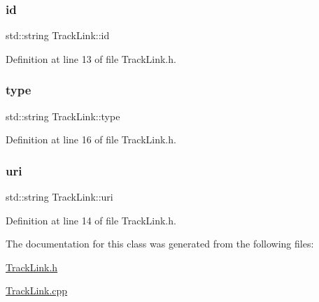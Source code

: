 \subsubsection{\texorpdfstring{id}{id}}
{\footnotesize\ttfamily std\+::string Track\+Link\+::id\hspace{0.3cm}{\ttfamily [private]}}



Definition at line 13 of file Track\+Link.\+h.

\mbox{\label{class_track_link_add28e057c305bdf0d385fc3a8326c39f}} 
\subsubsection{\texorpdfstring{type}{type}}
{\footnotesize\ttfamily std\+::string Track\+Link\+::type\hspace{0.3cm}{\ttfamily [private]}}



Definition at line 16 of file Track\+Link.\+h.

\mbox{\label{class_track_link_abac6786ff59efc469845a196eebdf63b}} 
\subsubsection{\texorpdfstring{uri}{uri}}
{\footnotesize\ttfamily std\+::string Track\+Link\+::uri\hspace{0.3cm}{\ttfamily [private]}}



Definition at line 14 of file Track\+Link.\+h.



The documentation for this class was generated from the following files\+:\begin{DoxyCompactItemize}
\item 
\mbox{\hyperlink{_track_link_8h}{Track\+Link.\+h}}\item 
\mbox{\hyperlink{_track_link_8cpp}{Track\+Link.\+cpp}}\end{DoxyCompactItemize}

